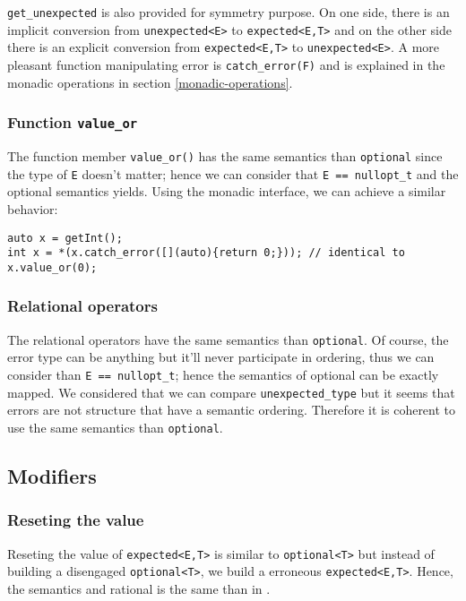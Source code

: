 \documentclass[a4paper,10pt]{article}
\newcommand{\cpp}[1]{\lstinline{#1}}
\begin{document}
\cpp{get_unexpected} is also provided for symmetry purpose. On one side, there is an implicit conversion from \cpp{unexpected<E>} to \cpp{expected<E,T>} and on the other side there is an explicit conversion from \cpp{expected<E,T>} to \cpp{unexpected<E>}. A more pleasant function manipulating error is \cpp{catch_error(F)} and is explained in the monadic operations in section \ref{monadic-operations}.

\subsubsection{Function \cpp{value_or}}

The function member \cpp{value_or()} has the same semantics than \cpp{optional}\cite{OptionalRev4} since the type of \cpp{E} doesn't matter; hence we can consider that \cpp{E == nullopt_t} and the optional semantics yields. Using the monadic interface, we can achieve a similar behavior:

\begin{lstlisting}
auto x = getInt();
int x = *(x.catch_error([](auto){return 0;})); // identical to x.value_or(0);
\end{lstlisting}

\subsubsection{Relational operators}

The relational operators have the same semantics than \cpp{optional}\cite{OptionalRev5}. Of course, the error type can be anything but it'll never participate in ordering, thus we can consider than \cpp{E == nullopt_t}; hence the semantics of optional can be exactly mapped. We considered that we can compare \cpp{unexpected_type} but it seems that errors are not structure that have a semantic ordering. Therefore it is coherent to use the same semantics than \cpp{optional}.

\subsection{Modifiers}

\subsubsection{Reseting the value}

Reseting the value of \cpp{expected<E,T>} is similar to \cpp{optional<T>} but instead of building a disengaged \cpp{optional<T>}, we build a erroneous \cpp{expected<E,T>}. Hence, the semantics and rational is the same than in \cite{OptionalRev4}.
\end{document}
